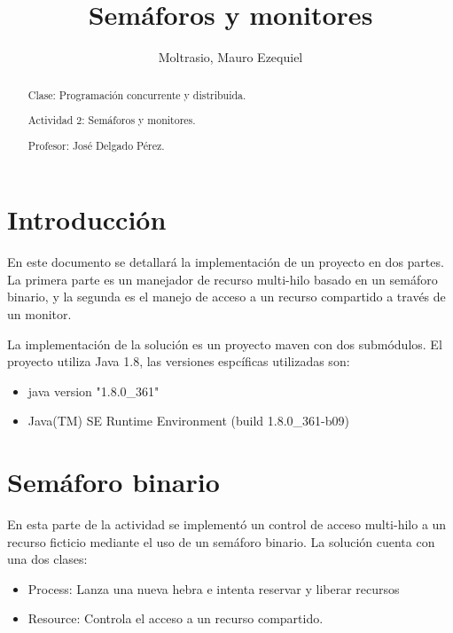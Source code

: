 \documentclass[a4paper]{article}
\begin{document}
\title{Semáforos y monitores}
\author{Moltrasio, Mauro Ezequiel}
\date{}
\renewcommand{\abstractname}{\vspace{-\baselineskip}}

\begin{titlingpage}
    \maketitle
    \begin{abstract}

        Clase: Programación concurrente y distribuida.

        Actividad 2: Semáforos y monitores.

        Profesor: José Delgado Pérez.
    \end{abstract}
\end{titlingpage}

\maketitle
\tableofcontents

\section{Introducción}

En este documento se detallará la implementación de un proyecto en dos partes.
La primera parte es un manejador de recurso multi-hilo basado en un semáforo
binario, y la segunda es el manejo de acceso a un recurso compartido a través
de un monitor.

La implementación de la solución es un proyecto maven con dos submódulos.
El proyecto utiliza Java 1.8, las versiones espcíficas utilizadas son:

\begin{itemize}
    \item java version "1.8.0\_361"
    \item Java(TM) SE Runtime Environment (build 1.8.0\_361-b09)
\end{itemize}

\section{Semáforo binario}

En esta parte de la actividad se implementó un control de acceso multi-hilo a
un recurso ficticio mediante el uso de un semáforo binario. La solución cuenta
con una dos clases:
\begin{itemize}
    \item Process: Lanza una nueva hebra e intenta reservar y liberar recursos
    \item Resource: Controla el acceso a un recurso compartido.
\end{itemize}
\end{document}
